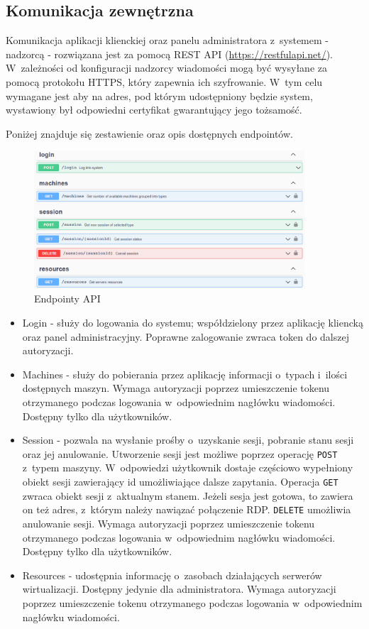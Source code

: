 \documentclass[../opis-rozwiazania.tex]{subfiles}
\begin{document}
\subsection{Komunikacja zewnętrzna}
\label{communication:api}
Komunikacja aplikacji klienckiej oraz panelu administratora z~systemem - nadzorcą - rozwiązana jest za pomocą REST API (\url{https://restfulapi.net/}). W~zależności od konfiguracji nadzorcy wiadomości mogą być wysyłane za pomocą protokołu HTTPS, który zapewnia ich szyfrowanie. W~tym celu wymagane jest aby na adres, pod którym udostępniony będzie system, wystawiony był odpowiedni certyfikat \parencite{ssl-cert} gwarantujący jego tożsamość.

Poniżej znajduje się zestawienie oraz opis dostępnych endpointów.

\begin{figure}[H]
  \centering
  \includegraphics[width=0.9\textwidth]{../api/endpoints.png}
  \caption{Endpointy API}
\end{figure}

\begin{itemize}
  \item Login - służy do logowania do systemu; współdzielony przez aplikację kliencką oraz panel administracyjny. Poprawne zalogowanie zwraca token do dalszej autoryzacji.
  \item Machines - służy do pobierania przez aplikację informacji o~typach i~ilości dostępnych maszyn. Wymaga autoryzacji poprzez umieszczenie tokenu otrzymanego podczas logowania w~odpowiednim nagłówku wiadomości. Dostępny tylko dla użytkowników.
  \item Session - pozwala na wysłanie prośby o~uzyskanie sesji, pobranie stanu sesji oraz jej anulowanie. Utworzenie sesji jest możliwe poprzez operację \texttt{POST} z~typem maszyny. W~odpowiedzi użytkownik dostaje częściowo wypełniony obiekt sesji zawierający id umożliwiające dalsze zapytania. Operacja \texttt{GET} zwraca obiekt sesji z~aktualnym stanem. Jeżeli sesja jest gotowa, to zawiera on też adres, z~którym należy nawiązać połączenie RDP. \texttt{DELETE} umożliwia anulowanie sesji. Wymaga autoryzacji poprzez umieszczenie tokenu otrzymanego podczas logowania w~odpowiednim nagłówku wiadomości. Dostępny tylko dla użytkowników.
  \item Resources - udostępnia informację o~zasobach działających serwerów wirtualizacji. Dostępny jedynie dla administratora. Wymaga autoryzacji poprzez umieszczenie tokenu otrzymanego podczas logowania w~odpowiednim nagłówku wiadomości.
\end{itemize}
\end{document}

